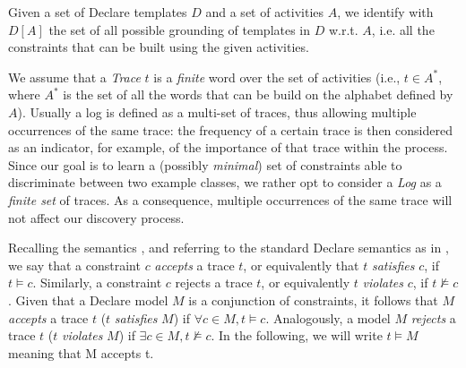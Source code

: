 

 Given a set of Declare templates $D$ and a set of activities $A$, we identify with $D[A]$ the set of all possible grounding of templates in $D$ w.r.t. $A$, i.e. all the constraints that can be built using the given activities.


 We assume that a \emph{Trace} $t$ is a \emph{finite} word over the set of activities (i.e., $t\in A^*$, where $A^*$ is the set of all the words that can be build on the alphabet defined by $A$).
%
Usually a log is defined as a multi-set of traces, thus allowing multiple occurrences of the same trace: the frequency of a certain trace is then considered as an indicator, for example, of the importance of that trace within the process. Since our goal is to learn a (possibly \emph{minimal}) set of constraints able to discriminate between two example classes, we rather opt to consider a \emph{Log} as a \emph{finite set} of traces. As a consequence, multiple occurrences of the same trace will not affect our discovery process.
%

 Recalling the \ltlf semantics \cite{DBLP:journals/tweb/MontaliPACMS10,DBLP:conf/ijcai/GiacomoV13}, and referring to the standard Declare semantics as in \cite{2008-Pesic}, we say that a constraint $c$ \emph{accepts} a trace $t$, or equivalently that $t$ \emph{satisfies} $c$, if $t \models c$. Similarly, a constraint $c$ rejects a trace $t$, or equivalently $t$ \emph{violates} $c$, if $t \not\models c$. Given that a Declare model $M$ is a conjunction of constraints, it follows that $M$ \emph{accepts} a trace $t$ ($t$ \emph{satisfies} $M$) if $\forall c \in M, t \models c$. Analogously, a model $M$ \emph{rejects} a trace $t$ ($t$ \emph{violates} $M$) if $\exists c \in M, t\not\models c$. In the following, we will write $t \models M$ meaning that M accepts t.



